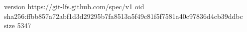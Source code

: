 version https://git-lfs.github.com/spec/v1
oid sha256:ffbb857a72abf1d3d29295b7fa8513a5f49c81f5f7581a40c97836d4cb39ddbc
size 5347
